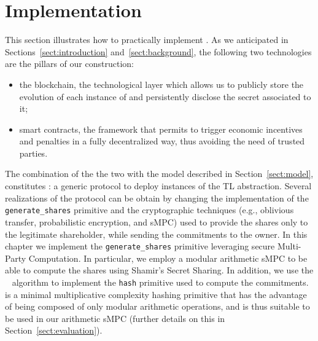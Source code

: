\section{Implementation}\label{sect:realization}

This section illustrates how to practically implement \shortname. 
\newline
As we anticipated in Sections~\ref{sect:introduction} and~\ref{sect:background}, the following two technologies are the pillars of our construction:
\begin{itemize}
	\item the blockchain, the technological layer which allows us to publicly store the evolution of each instance of \shortname and persistently disclose the secret associated to it;
	\item smart contracts, the framework that permits to trigger economic incentives and penalties in a fully decentralized way, thus avoiding the need of trusted parties.
\end{itemize}
The combination of the the two with the model described in Section~\ref{sect:model}, constitutes \shortname: a generic protocol to deploy instances of the TL abstraction.
Several realizations of the \shortname protocol can be obtain by changing the implementation of the \texttt{generate\_shares} primitive and the cryptographic techniques (e.g., oblivious transfer, probabilistic encryption, and sMPC) used to provide the shares only to the legitimate shareholder, while sending the commitments to the owner.
In this chapter we implement the \texttt{generate\_shares} primitive leveraging secure Multi-Party Computation.
In particular, we employ a modular arithmetic sMPC to be able to compute the shares using Shamir's Secret Sharing.
In addition, we use the {\em \mimc}~\cite{albrecht2016mimc} algorithm to implement the \texttt{hash} primitive used to compute the commitments.
\mimc is a minimal multiplicative complexity hashing primitive that has the advantage of being composed of only modular arithmetic operations, and is thus suitable to be used in our arithmetic sMPC
(further details on this in Section~\ref{sect:evaluation}).
  
